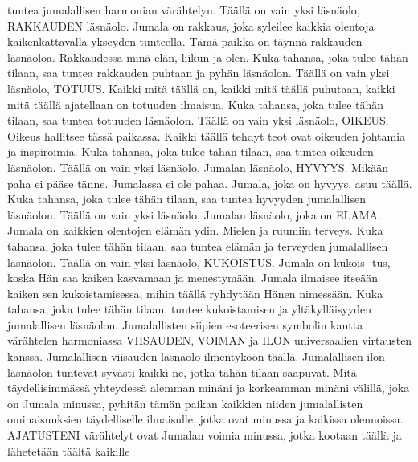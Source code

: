 {\begin{songs}{}
        tuntea jumalallisen harmonian värähtelyn.
        \parspace
        Täällä on vain yksi läsnäolo, RAKKAUDEN läsnäolo.
        Jumala on rakkaus, joka syleilee kaikkia olentoja
        kaikenkattavalla ykseyden tunteella. Tämä paikka on
        täynnä rakkauden läsnäoloa. Rakkaudessa minä elän,
        liikun ja olen. Kuka tahansa, joka tulee tähän tilaan,
        saa tuntea rakkauden puhtaan ja pyhän läsnäolon.
        \parspace
        Täällä on vain yksi läsnäolo, TOTUUS. Kaikki mitä
        täällä on, kaikki mitä täällä puhutaan, kaikki mitä
        täällä ajatellaan on totuuden ilmaisua. Kuka tahansa,
        joka tulee tähän tilaan, saa tuntea totuuden läsnäolon.
        \parspace
        Täällä on vain yksi läsnäolo, OIKEUS. Oikeus hallitsee
        tässä paikassa. Kaikki täällä tehdyt teot ovat oikeuden
        johtamia ja inspiroimia. Kuka tahansa, joka tulee tähän
        tilaan, saa tuntea oikeuden läsnäolon.
        \parspace
        Täällä on vain yksi läsnäolo, Jumalan läsnäolo, HYVYYS.
        Mikään paha ei pääse tänne. Jumalassa ei ole pahaa.
        Jumala, joka on hyvyys, asuu täällä. Kuka tahansa, joka
        tulee tähän tilaan, saa tuntea hyvyyden jumalallisen
        läsnäolon.
        \parspace
        Täällä on vain yksi läsnäolo, Jumalan läsnäolo, joka on
        ELÄMÄ. Jumala on kaikkien olentojen elämän ydin.
        Mielen ja ruumiin terveys. Kuka tahansa, joka tulee
        tähän tilaan, saa tuntea elämän ja terveyden jumalallisen
        läsnäolon.
        \parspace
        Täällä on vain yksi läsnäolo, KUKOISTUS. Jumala on kukois-
        tus, koska Hän saa kaiken kasvamaan ja menestymään.
        Jumala ilmaisee itseään kaiken sen kukoistamisessa,
        mihin täällä ryhdytään Hänen nimessään. Kuka tahansa,
        joka tulee tähän tilaan, tuntee kukoistamisen ja
        yltäkylläisyyden jumalallisen läsnäolon.
        \parspace
        Jumalallisten siipien esoteerisen symbolin kautta
        värähtelen harmoniassa VIISAUDEN, VOIMAN ja ILON
        universaalien virtausten kanssa. Jumalallisen viisauden
        läsnäolo ilmentyköön täällä. Jumalallisen ilon
        läsnäolon tuntevat syvästi kaikki ne, jotka tähän
        tilaan saapuvat.
        \parspace
        Mitä täydellisimmässä yhteydessä alemman minäni ja
        korkeamman minäni välillä, joka on Jumala minussa,
        pyhitän tämän paikan kaikkien niiden jumalallisten
        ominaisuuksien täydelliselle ilmaisulle, jotka ovat
        minussa ja kaikissa olennoissa.
        \parspace
        AJATUSTENI värähtelyt ovat Jumalan voimia minussa,
        jotka kootaan täällä ja lähetetään täältä kaikille

\end{songs}}

